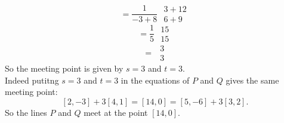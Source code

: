 \documentclass[12pt]{article}
\begin{document}
\[ = \frac{1}{-3 + 8} \hspace{4pt}\begin{array}{|c|}3 + 12\\6 + 9\end{array}\]
\[ = \frac{1}{5} \hspace{4pt}\begin{array}{|c|}15\\15\end{array}\]
\[ = \hspace{4pt}\begin{array}{|c|}3\\3\end{array}\]
So the meeting point is given by $s = 3$ and $t =3$.\\
Indeed putitng $s = 3$ and $t = 3$ in the equations of $P$ and $Q$ gives the same meeting point:
\[ [2, -3] + 3[4, 1] = [14, 0] = [5, -6] + 3[3, 2].\]
So the lines $P$ and $Q$ meet at the point $[14, 0]$.
\end{document}
